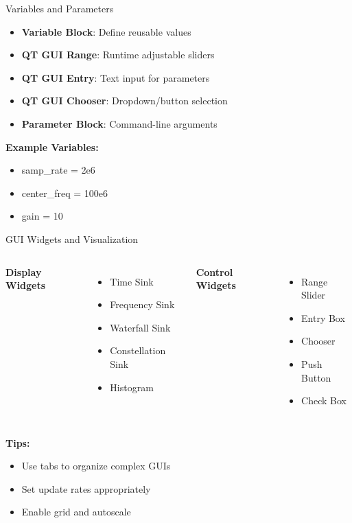 \documentclass[aspectratio=169,11pt]{beamer}
\begin{document}
\begin{frame}{Variables and Parameters}
\begin{itemize}
    \item \textbf{Variable Block}: Define reusable values
    \item \textbf{QT GUI Range}: Runtime adjustable sliders
    \item \textbf{QT GUI Entry}: Text input for parameters
    \item \textbf{QT GUI Chooser}: Dropdown/button selection
    \item \textbf{Parameter Block}: Command-line arguments
\end{itemize}

\textbf{Example Variables:}
\begin{itemize}
    \item samp\_rate = 2e6
    \item center\_freq = 100e6
    \item gain = 10
\end{itemize}
\end{frame}

\begin{frame}{GUI Widgets and Visualization}
\begin{columns}
\textbf{Display Widgets}
\begin{itemize}
    \item Time Sink
    \item Frequency Sink
    \item Waterfall Sink
    \item Constellation Sink
    \item Histogram
\end{itemize}

\textbf{Control Widgets}
\begin{itemize}
    \item Range Slider
    \item Entry Box
    \item Chooser
    \item Push Button
    \item Check Box
\end{itemize}
\end{columns}

\textbf{Tips:}
\begin{itemize}
    \item Use tabs to organize complex GUIs
    \item Set update rates appropriately
    \item Enable grid and autoscale
\end{itemize}
\end{frame}
\end{document}
